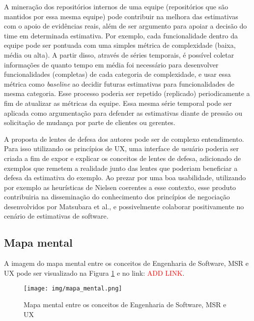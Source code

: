 \documentclass[12pt]{article}
\begin{document}
A mineração dos repositórios internos de uma equipe (repositórios que são mantidos por essa mesma equipe) pode contribuir na melhora das estimativas com o apoio de evidências reais, além de ser argumento para apoiar a decisão do time em determinada estimativa. Por exemplo, cada funcionalidade dentro da equipe pode ser pontuada com uma simples métrica de complexidade (baixa, média ou alta). A partir disso, através de séries temporais, é possível coletar informações de quanto tempo em média foi necessário para desenvolver funcionalidades (completas) de cada categoria de complexidade, e usar essa métrica como \textit{baseline} ao decidir futuras estimativas para funcionalidades de mesma categoria. Esse processo poderia ser repetido (replicado) periodicamente a fim de atualizar as métricas da equipe. Essa mesma série temporal pode ser aplicada como argumentação para defender as estimativas diante de pressão ou solicitação de mudança por parte de clientes ou gerentes.

A proposta de lentes de defesa dos autores pode ser de complexo entendimento. Para isso utilizando os princípios de UX, uma interface de usuário poderia ser criada a fim de expor e explicar os conceitos de lentes de defesa, adicionado de exemplos que remetem a realidade junto das lentes que poderiam beneficiar a defesa da estimativa do exemplo. Ao prezar por uma boa usabilidade, utilizando por exemplo as heurísticas de Nielsen coerentes a esse contexto, esse produto contribuiria na disseminação do conhecimento dos princípios de negociação desenvolvidos por Matsubara et al., e possivelmente colaborar positivamente no cenário de estimativas de software.

\subsection{Mapa mental}
A imagem do mapa mental entre os conceitos de Engenharia de Software, MSR e UX pode ser visualizado na Figura \ref{fig:mapa_mental} e no link: \textcolor{red}{ADD LINK}.
\begin{figure}[ht]
    \centering
    \texttt{[image: img/mapa\_mental.png]}
    \caption{Mapa mental entre os conceitos de Engenharia de Software, MSR e UX}
    \label{fig:mapa_mental}
\end{figure}
\end{document}
